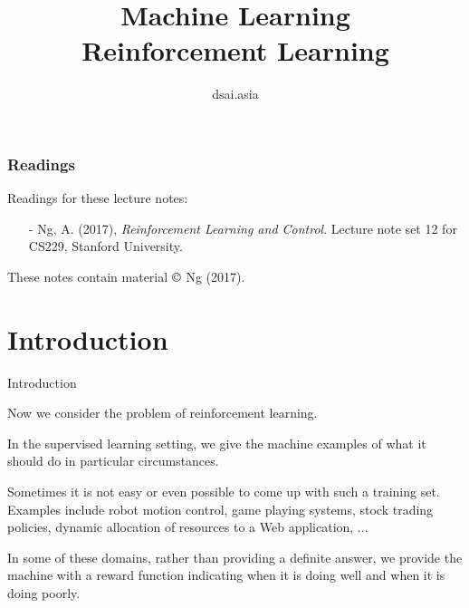 \documentclass{beamer}
\title[Machine Learning]{Machine Learning\\Reinforcement Learning}
\author{dsai.asia}
\institute[]{
  Asian Data Science and Artificial Intelligence Master's Program}
\date{}
\begin{document}


\frame{\titlepage}

%

\begin{frame}
\frametitle{Readings}

Readings for these lecture notes:
\begin{itemize}
\item[-] Ng, A. (2017), \textit{Reinforcement Learning and Control}.
  Lecture note set 12 for CS229, Stanford University.
\end{itemize}

These notes contain material $\copyright$ Ng (2017).

\end{frame}

\section{Introduction}

\begin{frame}{Introduction}

  Now we consider the problem of \alert{reinforcement learning}.

  \medskip

  In the supervised learning setting, we give the machine examples of
  what it should do in particular circumstances.

  \medskip

  Sometimes it is not easy or even possible to come up with such a
  training set.  Examples include robot motion control, game playing
  systems, stock trading policies, dynamic allocation of resources to
  a Web application, ...

  \medskip

  In some of these domains, rather than providing a definite answer,
  we provide the machine with a \alert{reward function} indicating when
  it is doing well and when it is doing poorly.


\end{frame}
\end{document}
